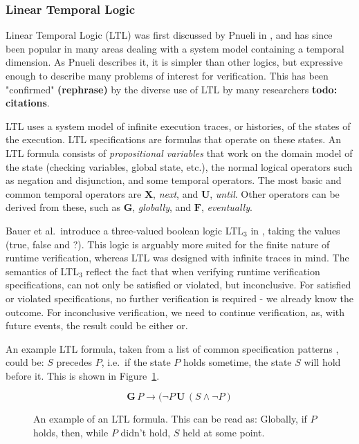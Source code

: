 \documentclass[a4paper,11pt]{kth-mag}
\newcommand{\todo}[1]{\textbf{todo: #1}}
\newcommand{\rephrase}{\textbf{(rephrase)} }
\begin{document}
\subsubsection{Linear Temporal Logic}

Linear Temporal Logic (LTL) was first discussed by Pnueli in \cite{pnueli77},
and has since been popular in many areas dealing with a system model containing
a temporal dimension. As Pnueli describes it, it is simpler than other logics,
but expressive enough to describe many problems of interest for verification.
This has been "confirmed" \rephrase by the diverse use of LTL by many
researchers \todo{citations}.

LTL uses a system model of infinite execution traces, or histories, of the
states of the execution. LTL specifications are formulas that operate on these
states. An LTL formula consists of \textit{propositional variables} that work
on the domain model of the state (checking variables, global state, etc.), the
normal logical operators such as negation and disjunction, and some temporal
operators. The most basic and common temporal operators are $\boldsymbol{X}$,
\textit{next}, and $\boldsymbol{U}$, \textit{until}. Other operators can be
derived from these, such as $\boldsymbol{G}$, \textit{globally}, and
$\boldsymbol{F}$, \textit{eventually}.

Bauer et al.\ introduce a three-valued boolean logic LTL$_3$ in
\cite{bauer06monitoring}, taking the values (true, false and ?). This logic is
arguably more suited for the finite nature of runtime verification, whereas LTL
was designed with infinite traces in mind. The semantics of LTL$_3$ reflect the
fact that when verifying runtime verification specifications, can not only
be satisfied or violated, but inconclusive. For satisfied or violated
specifications, no further verification is required - we already know the
outcome. For inconclusive verification, we need to continue verification, as,
with future events, the result could be either or.

An example LTL formula, taken from a list of common specification patterns
\cite{dwyer99patterns}, could be: $S$ precedes $P$, i.e.\, if the state $P$ holds
sometime, the state $S$ will hold before it. This is shown in
Figure~\ref{figure-ltl}.

\begin{figure}[h!]

\[
\boldsymbol{G} \, P \rightarrow (\neg P \, \boldsymbol{U} \, (S \wedge \neg P)
\]

\caption{An example of an LTL formula. This can be read as: Globally, if $P$
holds, then, while $P$ didn't hold, $S$ held at some point.}
\label{figure-ltl}
\end{figure}
\end{document}

